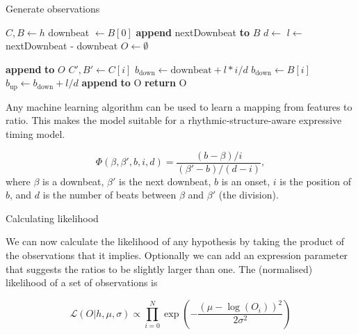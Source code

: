 \begin{algorithm}
\caption{Generate observations}
\label{alg:observations}
\begin{algorithmic}
	\State $C, B \leftarrow h$
		\State downbeat $\leftarrow B[0]$
	\EndIf
	\State \textbf{append} nextDownbeat \textbf{to} $B$
	\State $d \leftarrow$ 
	\State $l \leftarrow$ nextDownbeat - downbeat
	\State $O \leftarrow \emptyset$

			\State \textbf{append}  \textbf{to} $O$
		\EndIf	
		\State $C', B' \leftarrow C[i]$
			\State $b_{\mathrm{down}} \leftarrow \mathrm{downbeat} + l * i/d$
				\State $b_{\mathrm{down}} \leftarrow B[i]$
			\EndIf
			\State $b_{\mathrm{up}} \leftarrow b_{\mathrm{down}} + l/d$
			\State \textbf{append}  \textbf{to} O
		\EndIf
	\EndFor
	\State \textbf{return} O
\EndFunction
\end{algorithmic}
\end{algorithm}

Any machine learning algorithm can be used to learn a mapping from features to ratio. This makes the model suitable for a rhythmic-structure-aware expressive timing model.


\begin{equation}
\Phi(\beta, \beta', b, i, d) = \frac{(b - \beta) / i}{(\beta' - b) / (d - i)},
\end{equation}
where $\beta$ is a downbeat, $\beta'$ is the next downbeat, $b$ is an onset, $i$ is the position of $b$, and $d$ is the number of beats between $\beta$ and $\beta'$ (the division).

Calculating likelihood

We can now calculate the likelihood of any hypothesis by taking the product of the observations that it implies. Optionally we can add an expression parameter that suggests the ratios to be slightly larger than one. The (normalised) likelihood of a set of observations is

\begin{equation}
\label{eq:h_likelihood}
\mathcal{L}(O|h, \mu, \sigma) \propto \prod_{i=0}^N \exp\left(-\frac{(\mu - \log(O_i))^2}{2\sigma^2}\right)
\end{equation}

